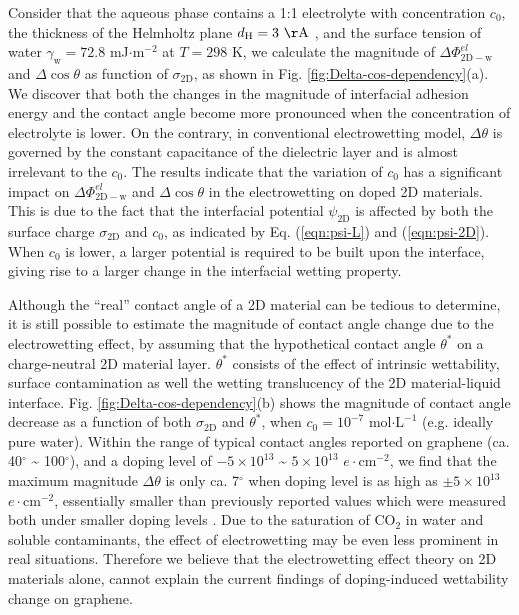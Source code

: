 \documentclass[aps,prl,reprint,groupedaddress,amsmath,amssymb, showpacs]{revtex4-1}
\begin{document}
Consider that the aqueous phase contains a 1:1 electrolyte with
concentration \(c_{0}\), the thickness of the Helmholtz plane
\(d_{\mathrm{H}}=3\ \mathrm{\AA}\) \cite{mcclendon_thickness_1927}, and
the surface tension of water \(\gamma_{\mathrm{w}}=72.8\) mJ\(\cdot
\mathrm{m}^{-2}\) at \(T=298\) K, we calculate the magnitude of
\(\Delta\Phi_{\mathrm{2D-w}}^{el}\) and \(\Delta\cos\theta\) as function
of \(\sigma_{\mathrm{2D}}\), as shown in
Fig. \ref{fig:Delta-cos-dependency}(a). We discover that both the
changes in the magnitude of interfacial adhesion energy and the
contact angle become more pronounced when the concentration of
electrolyte is lower. On the contrary, in conventional electrowetting
model, \(\Delta\theta\) is governed by the constant capacitance of the
dielectric layer and is almost irrelevant to the \(c_{0}\). The results indicate that the variation of \(c_{0}\) has a significant impact on \(\Delta
\Phi_{\mathrm{2D-w}}^{el}\) and \(\Delta \cos \theta\) in the
electrowetting on doped 2D materials. This is due to the fact that the
interfacial potential \(\psi_{\mathrm{2D}}\) is affected by both the
surface charge \(\sigma_{\mathrm{2D}}\) and \(c_{0}\), as indicated by
Eq. (\ref{eqn:psi-L}) and (\ref{eqn:psi-2D}). When \(c_{0}\) is lower, a
larger potential is required to be built upon the interface, giving
rise to a larger change in the interfacial wetting property.

Although the ``real'' contact angle of a 2D material can be tedious to
determine, it is still possible to estimate the magnitude of contact
angle change due to the electrowetting effect, by assuming that the
hypothetical contact angle \(\theta^{*}\) on a charge-neutral 2D
material layer. \(\theta^{*}\) consists of the effect of intrinsic
wettability, surface contamination as well the wetting translucency of
the 2D material-liquid interface. Fig. \ref{fig:Delta-cos-dependency}(b)
shows the magnitude of contact angle decrease as a function of both
\(\sigma_{\mathrm{2D}}\) and \(\theta^{*}\), when \(c_{0}=10^{-7}\)
mol\(\cdot \mathrm{L}^{-1}\) (e.g. ideally pure water). Within the range
of typical contact angles reported on graphene (ca. 40\(^{\circ}\) \textasciitilde{}
100\(^{\circ}\)), and a doping level of \(-5\times10^{13}\) \textasciitilde{}
\(5\times10^{13}\) \(e \cdot \mathrm{cm}^{-2}\), we find that the maximum
magnitude \(\Delta\theta\) is only ca. 7\(^{\circ}\) when doping level is
as high as \(\pm 5 \times 10^{13}\) \(e\cdot \mathrm{cm}^{-2}\),
essentially smaller than previously reported values which were
measured both under smaller doping levels
\cite{hong_mechanism_2016,ashraf_doping-induced_2016}.  Due to the
saturation of CO\(_{\text{2}}\) in water and soluble contaminants, the effect of
electrowetting may be even less prominent in real
situations. Therefore we believe that the electrowetting effect theory
on 2D materials alone, cannot explain the current findings of
doping-induced wettability change on graphene.
\end{document}

